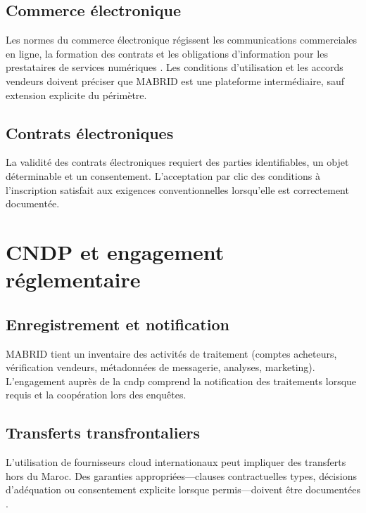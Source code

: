 \subsection{Commerce électronique}

Les normes du commerce électronique régissent les communications commerciales en ligne, la formation des contrats et les obligations d'information pour les prestataires de services numériques \parencite{uncecitc}. Les conditions d'utilisation et les accords vendeurs doivent préciser que MABRID est une plateforme intermédiaire, sauf extension explicite du périmètre.

\subsection{Contrats électroniques}

La validité des contrats électroniques requiert des parties identifiables, un objet déterminable et un consentement. L'acceptation par clic des conditions à l'inscription satisfait aux exigences conventionnelles lorsqu'elle est correctement documentée.

\section{CNDP et engagement réglementaire}

\subsection{Enregistrement et notification}

MABRID tient un inventaire des activités de traitement (comptes acheteurs, vérification vendeurs, métadonnées de messagerie, analyses, marketing). L'engagement auprès de la \gls{cndp} comprend la notification des traitements lorsque requis et la coopération lors des enquêtes.

\subsection{Transferts transfrontaliers}

L'utilisation de fournisseurs cloud internationaux peut impliquer des transferts hors du Maroc. Des garanties appropriées---clauses contractuelles types, décisions d'adéquation ou consentement explicite lorsque permis---doivent être documentées \parencite{euGDPRChapterV}.


